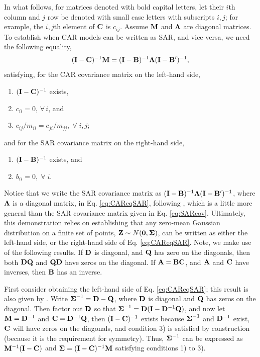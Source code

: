\documentclass[11pt, titlepage]{article}\usepackage[]{graphicx}\usepackage[]{color}
\begin{document}
\begin{spacing}{1.9}
\begin{flushleft}
In what follows, for matrices denoted with bold capital letters, let their $i$th column and $j$ row be denoted with small case letters with subscripts $i,j$; for example, the $i,j$th element of $\mathbf{C}$ is $c_{ij}$.  Assume $\mathbf{M}$ and $\mbox{\boldmath $\Lambda$}$ are diagonal matrices. To establish when CAR models can be written as SAR, and vice versa, we need the following equality,
\begin{equation} \label{eq:CAReqSAR}
(\mathbf{I}-\mathbf{C})^{-1}\mathbf{M} = (\mathbf{I} - \mathbf{B})^{-1}\mbox{\boldmath $\Lambda$}(\mathbf{I} - \mathbf{B}^{\prime})^{-1},
\end{equation}
satisfying, for the CAR covariance matrix on the left-hand side,
\begin{enumerate}[1)]
  \item $(\mathbf{I}-\mathbf{C})^{-1}$ exists, 
	\item  $c_{ii} = 0, \, \forall \, i$, and
	\item $c_{ij}/m_{ii}=c_{ji}/m_{jj}, \; \forall \; i,j$;
	\setcounter{saveenum}{\value{enumi}}
\end{enumerate}
and for the SAR covariance matrix on the right-hand side,
\begin{enumerate}[1)]
	\setcounter{enumi}{\value{saveenum}}
	\item $(\mathbf{I}-\mathbf{B})^{-1}$ exists, and 
	\item $b_{ii} = 0, \; \forall \; i$.  
\end{enumerate}
Notice that we write the SAR covariance matrix as $(\mathbf{I} - \mathbf{B})^{-1}\mbox{\boldmath $\Lambda$}(\mathbf{I} - \mathbf{B}^{\prime})^{-1}$, where $\mbox{\boldmath $\Lambda$}$ is a diagonal matrix, in Eq. \ref{eq:CAReqSAR}, following \citet[p. 409]{Cres:stat:1993}, which is a little more general than the SAR covariance matrix given in Eq. \ref{eq:SARcov}.  Ultimately, this demonstration relies on establishing that any zero-mean Gaussian distribution on a finite set of points, $\mathbf{Z} \sim N(\mathbf{0},\mbox{\boldmath $\Sigma$})$, can be written as either the left-hand side, or the right-hand side of Eq. \ref{eq:CAReqSAR}.  Note, we make use of the following results. If $\mathbf{D}$ is diagonal, and $\mathbf{Q}$ has zero on the diagonals, then both $\mathbf{D}\mathbf{Q}$ and $\mathbf{Q}\mathbf{D}$ have zeros on the diagonal. If $\mathbf{A} = \mathbf{B}\mathbf{C}$, and $\mathbf{A}$ and $\mathbf{C}$ have inverses, then $\mathbf{B}$ has an inverse. 

First consider obtaining the left-hand side of Eq. \ref{eq:CAReqSAR}; this result is also given by \citet[p. 434]{Cres:stat:1993}. Write $\mbox{\boldmath $\Sigma$}^{-1} = \mathbf{D} - \mathbf{Q}$, where $\mathbf{D}$ is diagonal and $\mathbf{Q}$ has zeros on the diagonal.  Then factor out $\mathbf{D}$ so that $\mbox{\boldmath $\Sigma$}^{-1} = \mathbf{D}(\mathbf{I} - \mathbf{D}^{-1}\mathbf{Q})$, and now let $\mathbf{M} = \mathbf{D}^{-1}$ and $\mathbf{C} = \mathbf{D}^{-1}\mathbf{Q}$, then $(\mathbf{I} - \mathbf{C})^{-1}$ exists because $\mbox{\boldmath $\Sigma$}^{-1}$ and $\mathbf{D}^{-1}$ exist, $\mathbf{C}$ will have zeros on the diagonals, and condition 3) is satisfied by construction (because it is the requirement for symmetry).  Thus, $\mbox{\boldmath $\Sigma$}^{-1}$ can be expressed as $\mathbf{M}^{-1}(\mathbf{I} - \mathbf{C})$ and $\mbox{\boldmath $\Sigma$} = (\mathbf{I}-\mathbf{C})^{-1}\mathbf{M}$ satisfying conditions 1) to 3).


\end{flushleft}
\end{spacing}
\end{document}
